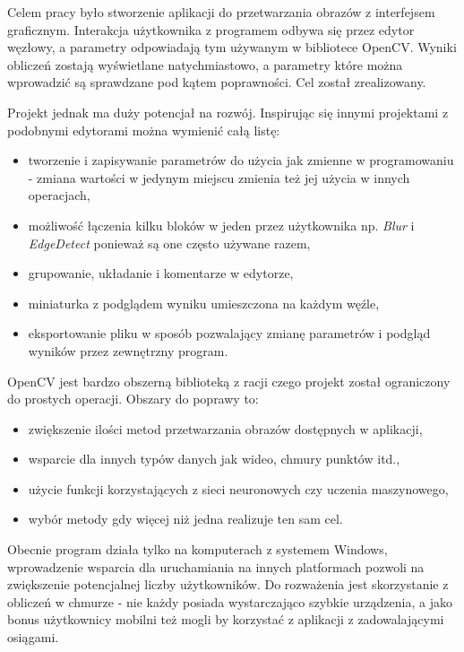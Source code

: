 Celem pracy było stworzenie aplikacji do przetwarzania obrazów z interfejsem graficznym.
Interakcja użytkownika z programem odbywa się przez edytor węzłowy, a parametry odpowiadają tym używanym w bibliotece OpenCV. 
Wyniki obliczeń zostają wyświetlane natychmiastowo, a parametry które można wprowadzić są sprawdzane pod kątem poprawności.  
Cel został zrealizowany.

Projekt jednak ma duży potencjał na rozwój. Inspirując się innymi projektami z podobnymi edytorami można wymienić całą listę: 
\begin{itemize}
    \item tworzenie i zapisywanie parametrów do użycia jak zmienne w programowaniu - zmiana wartości w jedynym miejscu zmienia też jej użycia w innych operacjach,
    \item możliwość łączenia kilku bloków w jeden przez użytkownika np. \textit{Blur} i \textit{EdgeDetect} ponieważ są one często używane razem,
    \item grupowanie, układanie i komentarze w edytorze,
    \item miniaturka z podglądem wyniku umieszczona na każdym węźle,
    \item eksportowanie pliku w sposób pozwalający zmianę parametrów i podgląd wyników przez zewnętrzny program.
\end{itemize}

OpenCV jest bardzo obszerną biblioteką z racji czego projekt został ograniczony do prostych operacji. Obszary do poprawy to:
\begin{itemize}
    \item zwiększenie ilości metod przetwarzania obrazów dostępnych w aplikacji,
    \item wsparcie dla innych typów danych jak wideo, chmury punktów itd.,
    \item użycie funkcji korzystających z sieci neuronowych czy uczenia maszynowego,
    \item wybór metody gdy więcej niż jedna realizuje ten sam cel.
\end{itemize}

Obecnie program działa tylko na komputerach z systemem Windows, wprowadzenie wsparcia dla uruchamiania na innych platformach pozwoli na zwiększenie potencjalnej liczby użytkowników. Do rozważenia jest skorzystanie z obliczeń w chmurze - nie każdy posiada wystarczająco szybkie urządzenia, a jako bonus użytkownicy mobilni też mogli by korzystać z aplikacji z zadowalającymi osiągami. 